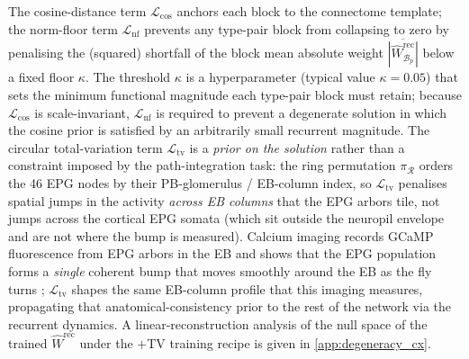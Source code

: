 \documentclass[11pt]{article}
\begin{document}
The cosine-distance term $\mathcal{L}_{\mathrm{cos}}$ anchors each block to the connectome template; the norm-floor term $\mathcal{L}_{\mathrm{nf}}$ prevents any type-pair block from collapsing to zero by penalising the (squared) shortfall of the block mean absolute weight $\overline{|\hat{W}^{\mathrm{rec}}_{\mathcal{B}_p}|}$ below a fixed floor $\kappa$. The threshold $\kappa$ is a hyperparameter (typical value $\kappa = 0.05$) that sets the minimum functional magnitude each type-pair block must retain; because $\mathcal{L}_{\mathrm{cos}}$ is scale-invariant, $\mathcal{L}_{\mathrm{nf}}$ is required to prevent a degenerate solution in which the cosine prior is satisfied by an arbitrarily small recurrent magnitude. The circular total-variation term $\mathcal{L}_{\mathrm{tv}}$ is a \emph{prior on the solution} rather than a constraint imposed by the path-integration task: the ring permutation $\pi_{\mathcal{R}}$ orders the 46 EPG nodes by their PB-glomerulus / EB-column index, so $\mathcal{L}_{\mathrm{tv}}$ penalises spatial jumps in the activity \emph{across EB columns} that the EPG arbors tile, not jumps across the cortical EPG somata (which sit outside the neuropil envelope and are not where the bump is measured). Calcium imaging records GCaMP fluorescence from EPG arbors in the EB and shows that the EPG population forms a \emph{single} coherent bump that moves smoothly around the EB as the fly turns \citep{seelig2015,kim2017,green2017}; $\mathcal{L}_{\mathrm{tv}}$ shapes the same EB-column profile that this imaging measures, propagating that anatomical-consistency prior to the rest of the network via the recurrent dynamics. A linear-reconstruction analysis of the null space of the trained $\hat{W}^{\mathrm{rec}}$ under the $+$TV training recipe is given in \cref{app:degeneracy_cx}.
\end{document}
